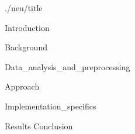 \documentclass{article}
\begin{document}
{./neu/title}

\frontmatter

\tableofcontents


\mainmatter

{Introduction}

{Background}

{Data_analysis_and_preprocessing}

{Approach}

{Implementation_specifics}

{Results}
{Conclusion}

\newpage
\printbibliography[heading = bibintoc, title = Bibliography]    %

\end{document}
